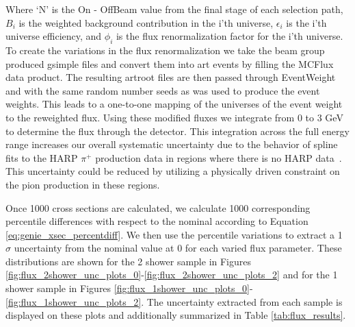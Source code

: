 \documentclass{article}
\begin{document}
Where `N' is the On - OffBeam value from the final stage of each selection path, $B_i$ is the weighted background contribution in the i'th universe, $\epsilon_i$ is the i'th universe efficiency, and $\phi_i$ is the flux renormalization factor for the i'th universe. To create the variations in the flux renormalization we take the beam group produced gsimple files and convert them into art events by filling the MCFlux data product. The resulting artroot files are then passed through EventWeight and with the same random number seeds as was used to produce the event weights. This leads to a one-to-one mapping of the universes of the event weight to the reweighted flux. Using these modified fluxes we integrate from 0 to 3 GeV to determine the flux through the detector. This integration across the full energy range increases our overall systematic uncertainty due to the behavior of spline fits to the HARP $\pi^{+}$ production data in regions where there is no HARP data~\cite{bib:flux_uncertainty_tn}. This uncertainty could be reduced by utilizing a physically driven constraint on the pion production in these regions.   


Once 1000 cross sections are calculated, we calculate 1000 corresponding percentile differences with respect to the nominal according to Equation \ref{eq:genie_xsec_percentdiff}. We then use the percentile variations to extract a 1 $\sigma$ uncertainty from the nominal value at 0 for each varied flux parameter.  These distributions are shown for the 2 shower sample in Figures \ref{fig:flux_2shower_unc_plots_0}-\ref{fig:flux_2shower_unc_plots_2} and for the 1 shower sample in Figures \ref{fig:flux_1shower_unc_plots_0}-\ref{fig:flux_1shower_unc_plots_2}. The uncertainty extracted from each sample is displayed on these plots and additionally summarized in Table \ref{tab:flux_results}.  




\end{document}
